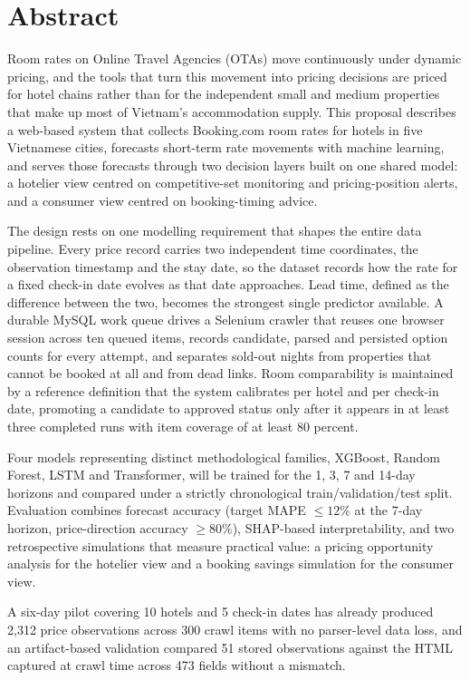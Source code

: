 \chapter*{Abstract}

Room rates on Online Travel Agencies (OTAs) move continuously under dynamic pricing, and the tools that turn this movement into pricing decisions are priced for hotel chains rather than for the independent small and medium properties that make up most of Vietnam's accommodation supply. This proposal describes a web-based system that collects Booking.com room rates for hotels in five Vietnamese cities, forecasts short-term rate movements with machine learning, and serves those forecasts through two decision layers built on one shared model: a hotelier view centred on competitive-set monitoring and pricing-position alerts, and a consumer view centred on booking-timing advice.

The design rests on one modelling requirement that shapes the entire data pipeline. Every price record carries two independent time coordinates, the observation timestamp and the stay date, so the dataset records how the rate for a fixed check-in date evolves as that date approaches. Lead time, defined as the difference between the two, becomes the strongest single predictor available. A durable MySQL work queue drives a Selenium crawler that reuses one browser session across ten queued items, records candidate, parsed and persisted option counts for every attempt, and separates sold-out nights from properties that cannot be booked at all and from dead links. Room comparability is maintained by a reference definition that the system calibrates per hotel and per check-in date, promoting a candidate to approved status only after it appears in at least three completed runs with item coverage of at least 80 percent.

Four models representing distinct methodological families, XGBoost, Random Forest, LSTM and Transformer, will be trained for the 1, 3, 7 and 14-day horizons and compared under a strictly chronological train/validation/test split. Evaluation combines forecast accuracy (target MAPE $\leq 12\%$ at the 7-day horizon, price-direction accuracy $\geq 80\%$), SHAP-based interpretability, and two retrospective simulations that measure practical value: a pricing opportunity analysis for the hotelier view and a booking savings simulation for the consumer view.

A six-day pilot covering 10 hotels and 5 check-in dates has already produced 2{,}312 price observations across 300 crawl items with no parser-level data loss, and an artifact-based validation compared 51 stored observations against the HTML captured at crawl time across 473 fields without a mismatch.

\newpage
